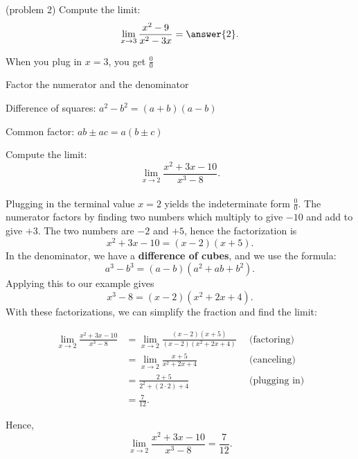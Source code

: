 \documentclass[handout]{ximera}
\begin{document}
\begin{problem}(problem 2)
  Compute the limit:
  \[  \lim_{x \to 3} \frac{x^2 - 9}{x^2 - 3x} = \answer{2}.  \]
    \begin{hint}
      When you plug in $x = 3$, you get $\frac00$
    \end{hint}
    \begin{hint}
      Factor the numerator and the denominator
    \end{hint}
    \begin{hint}
      Difference of squares: $a^2 - b^2 = (a+b)(a-b)$
    \end{hint}
    \begin{hint}
      Common factor: $ab \pm ac = a(b \pm c)$
    \end{hint}
\end{problem}


\begin{example}[example 3]
Compute the limit: \[\lim_{x \to 2} \frac{x^2 + 3x - 10}{x^3 - 8}.\]
\\
Plugging in the terminal value $x = 2$ yields the indeterminate form $\frac00$.
The numerator factors  by finding two numbers which multiply to give $-10$ and add to give $+3$.  
The two numbers are 
$-2$ and $+5$, hence the factorization is  
\[x^2 + 3x - 10 = (x-2)(x+5).\]
In the denominator, we have a \textbf{difference of cubes}, and we use the formula:
\[a^3 - b^3 = (a-b)(a^2+ab +b^2).\]
Applying this to our example gives 
\[x^3 - 8 = (x-2)(x^2 + 2x + 4).\]
With these factorizations, we can simplify the fraction and find the limit:

\begin{align*}
\lim_{x \to 2} \frac{x^2 + 3x - 10}{x^3 - 8} &= \lim_{x \to 2}\frac{(x-2)(x+5)}{(x-2)(x^2 + 2x + 4)} 
\enspace & \text{(factoring)} \\[.4 em]
&= \lim_{x \to 2} \frac{x+5}{x^2 + 2x + 4} & \text{(canceling)} \\[.4 em]
&= \frac{2+5}{2^2 + (2\cdot 2) + 4} & \text{(plugging in)} \\[.4 em]
&= \frac{7}{12}. 
\end{align*}

Hence,
\[\lim_{x \to 2} \frac{x^2 + 3x - 10}{x^3 - 8} = \frac{7}{12}.\]
\end{example}
\end{document}
